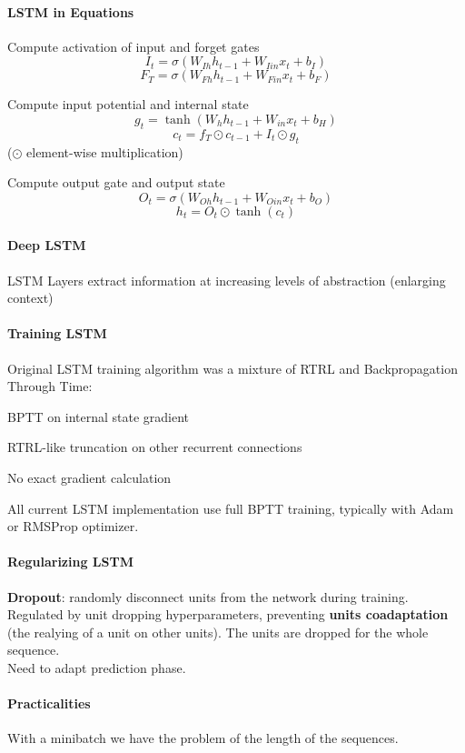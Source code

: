 \documentclass[10pt]{report}
\begin{document}
\paragraph{LSTM in Equations}
\begin{list}{}{}
	\item Compute activation of input and forget gates
	$$I_t=\sigma(W_{Ih}h_{t-1} + W_{Iin}x_t + b_I)$$
	$$F_T=\sigma(W_{Fh}h_{t-1} + W_{Fin}x_t + b_F)$$
	\item Compute input potential and internal state
	$$g_t = \tanh(W_hh_{t-1} + W_{in}x_t + b_H)$$
	$$c_t = f_T\odot c_{t-1} + I_t\odot g_t$$
	($\odot$ element-wise multiplication)
	\item Compute output gate and output state
	$$O_t = \sigma(W_{Oh}h_{t-1} + W_{Oin}x_t + b_O)$$
	$$h_t = O_t\odot\tanh(c_t)$$
\end{list}
\paragraph{Deep LSTM} LSTM Layers extract information at increasing levels of abstraction (enlarging context)
\paragraph{Training LSTM} Original LSTM training algorithm was a mixture of RTRL and Backpropagation Through Time:
\begin{list}{}{}
	\item BPTT on internal state gradient
	\item RTRL-like truncation on other recurrent connections
	\item No exact gradient calculation
\end{list}
All current LSTM implementation use full BPTT training, typically with Adam or RMSProp optimizer.
\paragraph{Regularizing LSTM}\begin{list}{}{}
	\item \textbf{Dropout}: randomly disconnect units from the network during training. Regulated by unit dropping hyperparameters, preventing \textbf{units coadaptation} (the realying of a unit on other units). The units are dropped for the whole sequence.\\Need to adapt prediction phase.
	
\end{list}
\paragraph{Practicalities} With a minibatch we have the problem of the length of the sequences.
\end{document}
